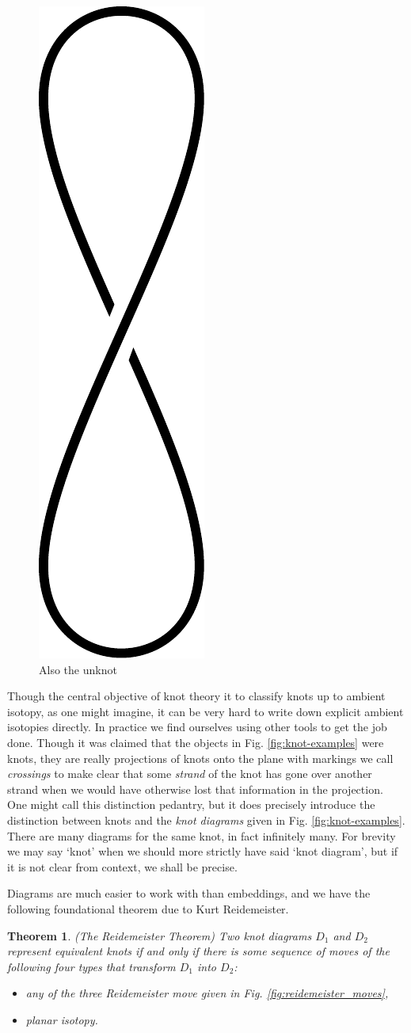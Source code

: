 \documentclass[12pt]{report}
\newtheorem*{theorem}{Theorem}
\begin{document}
\begin{figure}[hbt]
	\centering
	\includegraphics[width=0.25\linewidth]{graphics/unknot_twisted}
	\caption{Also the unknot}
	\label{fig:unknot_twisted}
\end{figure}

Though the central objective of knot theory it to classify knots up to ambient isotopy, as one might imagine, it can be very hard to write down explicit ambient isotopies directly. In practice we find ourselves using other tools to get the job done. Though it was claimed that the objects in Fig. \ref{fig:knot-examples} were knots, they are really projections of knots onto the plane with markings we call \textit{crossings} to make clear that some \textit{strand} of the knot has gone over another strand when we would have otherwise lost that information in the projection. One might call this distinction pedantry, but it does precisely introduce the distinction between knots and the \textit{knot diagrams} given in Fig. \ref{fig:knot-examples}. There are many diagrams for the same knot, in fact infinitely many. For brevity we may say `knot' when we should more strictly have said `knot diagram', but if it is not clear from context, we shall be precise.

Diagrams are much easier to work with than embeddings, and we have the following foundational theorem due to Kurt Reidemeister.
\begin{theorem}(The Reidemeister Theorem)
Two knot diagrams $D_{1}$ and $D_{2}$ represent equivalent knots if and only if there is some sequence of moves of the following four types that transform $D_{1}$ into $D_{2}$:
\begin{itemize}
	\item any of the three Reidemeister move given in Fig. \ref{fig:reidemeister_moves},
	\item planar isotopy.
\end{itemize}
\end{theorem}
\end{document}
